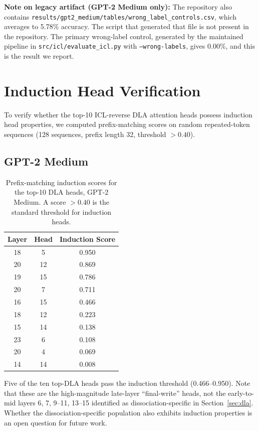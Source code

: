 \documentclass[11pt]{article}
\begin{document}
\textbf{Note on legacy artifact (GPT-2 Medium only):} The repository also
contains \texttt{results/gpt2\_medium/tables/wrong\_label\_controls.csv}, which
averages to 5.78\% accuracy. The script that generated that file is not present
in the repository. The primary wrong-label control, generated by the maintained
pipeline in \texttt{src/icl/evaluate\_icl.py} with \texttt{---wrong-labels},
gives 0.00\%, and this is the result we report.

\section{Induction Head Verification}
\label{app:induction}

To verify whether the top-10 ICL-reverse DLA attention heads possess induction
head properties, we computed prefix-matching scores on random repeated-token
sequences (128 sequences, prefix length 32, threshold $> 0.40$).

\subsection{GPT-2 Medium}

\begin{table}[H]
\centering
\caption{Prefix-matching induction scores for the top-10 DLA heads,
GPT-2 Medium. A score $>0.40$ is the standard threshold for induction heads.}
\label{tab:induction_medium}
\begin{tabular}{ccc}
\toprule
\textbf{Layer} & \textbf{Head} & \textbf{Induction Score} \\
\midrule
18 &  5 & 0.950 \\
20 & 12 & 0.869 \\
19 & 15 & 0.786 \\
20 &  7 & 0.711 \\
16 & 15 & 0.466 \\
18 & 12 & 0.223 \\
15 & 14 & 0.138 \\
23 &  6 & 0.108 \\
20 &  4 & 0.069 \\
14 & 14 & 0.008 \\
\bottomrule
\end{tabular}
\end{table}

Five of the ten top-DLA heads pass the induction threshold (0.466--0.950). Note
that these are the high-magnitude late-layer ``final-write'' heads, not the
early-to-mid layers 6, 7, 9--11, 13--15 identified as dissociation-specific in
Section~\ref{sec:dla}. Whether the dissociation-specific population also exhibits
induction properties is an open question for future work.
\end{document}

